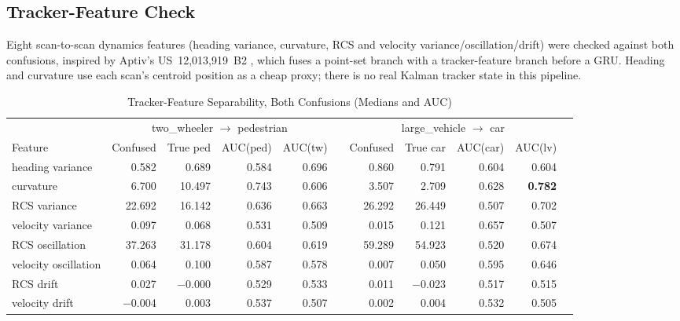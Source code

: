 \documentclass[10pt,letterpaper]{IEEEtran}
\begin{document}
\subsection{Tracker-Feature Check}

Eight scan-to-scan dynamics features (heading variance, curvature, RCS and
velocity variance/oscillation/drift) were checked against both confusions,
inspired by Aptiv's US~12{,}013{,}919~B2 \cite{aptiv2024patent}, which fuses
a point-set branch with a tracker-feature branch before a GRU. Heading and
curvature use each scan's centroid position as a cheap proxy; there is no
real Kalman tracker state in this pipeline.

\begin{table}[t]
  \centering
  \caption{Tracker-Feature Separability, Both Confusions (Medians and AUC)}
  \label{tab:tracker}
  \footnotesize
  \begin{tabular}{lrrrrrrrrrr}
    \toprule
    & \multicolumn{4}{c}{two\_wheeler $\to$ pedestrian} & & \multicolumn{4}{c}{large\_vehicle $\to$ car} \\
    \cmidrule{2-5} \cmidrule{7-10}
    Feature & Confused & True ped & AUC(ped) & AUC(tw) & & Confused & True car & AUC(car) & AUC(lv) \\
    \midrule
    heading variance        & 0.582  & 0.689  & 0.584 & 0.696 & & 0.860  & 0.791  & 0.604 & 0.604 \\
    curvature                & 6.700  & 10.497 & 0.743 & 0.606 & & 3.507  & 2.709  & 0.628 & \textbf{0.782} \\
    RCS variance             & 22.692 & 16.142 & 0.636 & 0.663 & & 26.292 & 26.449 & 0.507 & 0.702 \\
    velocity variance        & 0.097  & 0.068  & 0.531 & 0.509 & & 0.015  & 0.121  & 0.657 & 0.507 \\
    RCS oscillation           & 37.263 & 31.178 & 0.604 & 0.619 & & 59.289 & 54.923 & 0.520 & 0.674 \\
    velocity oscillation      & 0.064  & 0.100  & 0.587 & 0.578 & & 0.007  & 0.050  & 0.595 & 0.646 \\
    RCS drift                 & 0.027  & $-$0.000 & 0.529 & 0.533 & & 0.011  & $-$0.023 & 0.517 & 0.515 \\
    velocity drift             & $-$0.004 & 0.003 & 0.537 & 0.507 & & 0.002  & 0.004  & 0.532 & 0.505 \\
    \bottomrule
  \end{tabular}
\end{table}
\end{document}
